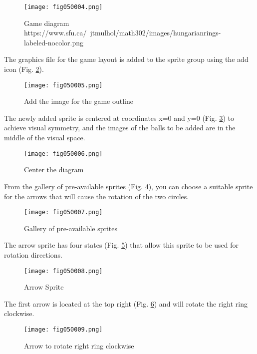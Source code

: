 \begin{figure}[H]
   \centering
   \texttt{[image: fig050004.png]}
   \caption{Game diagram \\ https://www.sfu.ca/~jtmulhol/math302/images/hungarianrings-labeled-nocolor.png}
\label{fig050004}
\end{figure}

The graphics file for the game layout is added to the sprite group using the add icon (Fig. \ref{fig050005}).

\begin{figure}[H]
   \centering
   \texttt{[image: fig050005.png]}
   \caption{Add the image for the game outline}
\label{fig050005}
\end{figure}

The newly added sprite is centered at coordinates x=0 and y=0 (Fig. \ref{fig050006}) to achieve visual symmetry, and the images of the balls to be added are in the middle of the visual space.

\begin{figure}[H]
   \centering
   \texttt{[image: fig050006.png]}
   \caption{Center the diagram}
\label{fig050006}
\end{figure}

From the gallery of pre-available sprites (Fig. \ref{fig050007}), you can choose a suitable sprite for the arrows that will cause the rotation of the two circles.

\begin{figure}[H]
   \centering
   \texttt{[image: fig050007.png]}
   \caption{Gallery of pre-available sprites}
\label{fig050007}
\end{figure}

The arrow sprite has four states (Fig. \ref{fig050008}) that allow this sprite to be used for rotation directions.

\begin{figure}[H]
   \centering
   \texttt{[image: fig050008.png]}
   \caption{Arrow Sprite}
\label{fig050008}
\end{figure}

The first arrow is located at the top right (Fig. \ref{fig050009}) and will rotate the right ring clockwise.

\begin{figure}[H]
   \centering
   \texttt{[image: fig050009.png]}
   \caption{Arrow to rotate right ring clockwise}
\label{fig050009}
\end{figure}

